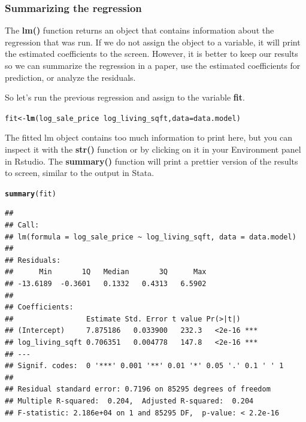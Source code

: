 \documentclass[10pt]{article}\usepackage[]{graphicx}\usepackage[]{color}
\makeatletter
\newcommand{\hlopt}[1]{\textcolor[rgb]{0,0,0}{#1}}%
\newcommand{\hlstd}[1]{\textcolor[rgb]{0.345,0.345,0.345}{#1}}%
\newcommand{\hlkwb}[1]{\textcolor[rgb]{0.69,0.353,0.396}{#1}}%
\newcommand{\hlkwc}[1]{\textcolor[rgb]{0.333,0.667,0.333}{#1}}%
\newcommand{\hlkwd}[1]{\textcolor[rgb]{0.737,0.353,0.396}{\textbf{#1}}}%
\newenvironment{kframe}{%
 \def\at@end@of@kframe{}%
 \ifinner\ifhmode%
  \def\at@end@of@kframe{\end{minipage}}%
  \begin{minipage}{\columnwidth}%
 \fi\fi%
 \def\FrameCommand##1{\hskip\@totalleftmargin \hskip-\fboxsep
 \colorbox{shadecolor}{##1}\hskip-\fboxsep
     \hskip-\linewidth \hskip-\@totalleftmargin \hskip\columnwidth}%
 \MakeFramed {\advance\hsize-\width
   \@totalleftmargin\z@ \linewidth\hsize
   \@setminipage}}%
 {\par\unskip\endMakeFramed%
 \at@end@of@kframe}
\newenvironment{knitrout}{}{} %
\makeatother
\begin{document}
\subsubsection*{Summarizing the regression}

The {\bf lm()} function returns an object that contains information about the regression that was run. If we do not assign the object to a variable, it will print the estimated coefficients to the screen. However, it is better to keep our results so we can summarize the regression in a paper, use the estimated coefficients for prediction, or analyze the residuals.

So let's run the previous regression and assign to the variable {\bf fit}.

\begin{knitrout}\small
{}\color{fgcolor}\begin{kframe}
\begin{alltt}
\hlstd{fit}\hlkwb{<-}\hlkwd{lm}\hlstd{(log_sale_price} \hlopt{~} \hlstd{log_living_sqft,} \hlkwc{data}\hlstd{=data.model)}
\end{alltt}
\end{kframe}
\end{knitrout}

The fitted lm object contains too much information to print here, but you can inspect it with the {\bf str()} function or by clicking on it in your Environment panel in Rstudio. The {\bf summary()} function will print a prettier version of the results to screen, similar to the output in Stata.

\begin{knitrout}\small
{}\color{fgcolor}\begin{kframe}
\begin{alltt}
\hlkwd{summary}\hlstd{(fit)}
\end{alltt}
\begin{verbatim}
## 
## Call:
## lm(formula = log_sale_price ~ log_living_sqft, data = data.model)
## 
## Residuals:
##      Min       1Q   Median       3Q      Max 
## -13.6189  -0.3601   0.1332   0.4313   6.5902 
## 
## Coefficients:
##                 Estimate Std. Error t value Pr(>|t|)    
## (Intercept)     7.875186   0.033900   232.3   <2e-16 ***
## log_living_sqft 0.706351   0.004778   147.8   <2e-16 ***
## ---
## Signif. codes:  0 '***' 0.001 '**' 0.01 '*' 0.05 '.' 0.1 ' ' 1
## 
## Residual standard error: 0.7196 on 85295 degrees of freedom
## Multiple R-squared:  0.204,	Adjusted R-squared:  0.204 
## F-statistic: 2.186e+04 on 1 and 85295 DF,  p-value: < 2.2e-16
\end{verbatim}
\end{kframe}
\end{knitrout}
\end{document}
